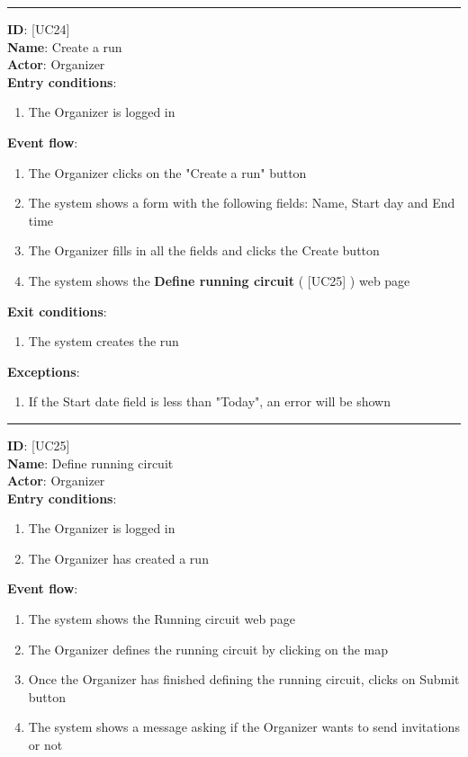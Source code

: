 \documentclass[a4paper, hidelinks, 12pt]{report}
\newcommand\usecase[1]{ [UC#1] }
\begin{document}
\begin{itemize}
		\rule{\linewidth}{0.4pt}
		\textbf{ID}: \usecase{24} \\
		\textbf{Name}: Create a run \\
		\textbf{Actor}: Organizer \\
		\textbf{Entry conditions}:
		\begin{enumerate}
			\item{The Organizer is logged in}
		\end{enumerate}
		\textbf{Event flow}:
		\begin{enumerate}
			\item{The Organizer clicks on the "Create a run" button}
			\item{The system shows a form with the following fields: Name, Start day and End time}
			\item{The Organizer fills in all the fields and clicks the Create button}
			\item{The system shows the \textbf{Define running circuit} (\usecase{25}) web page}
		\end{enumerate}
		\textbf{Exit conditions}:
		\begin{enumerate}
			\item{The system creates the run}
		\end{enumerate}
		\textbf{Exceptions}:
		\begin{enumerate}
			\item{If the Start date field is less than "Today", an error will be shown}
		\end{enumerate}
		\rule{\linewidth}{0.4pt}
		\textbf{ID}: \usecase{25} \\
		\textbf{Name}: Define running circuit \\
		\textbf{Actor}: Organizer \\
		\textbf{Entry conditions}:
		\begin{enumerate}
			\item{The Organizer is logged in}
			\item{The Organizer has created a run}
		\end{enumerate}
		\textbf{Event flow}:
		\begin{enumerate}
			\item{The system shows the Running circuit web page}
			\item{The Organizer defines the running circuit by clicking on the map}
			\item{Once the Organizer has finished defining the running circuit, clicks on Submit button}
			\item{The system shows a message asking if the Organizer wants to send invitations or not}

\end{enumerate}
\end{itemize}
\end{document}
